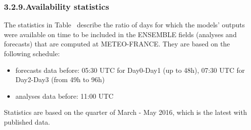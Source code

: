 \documentclass[9pt]{report}
\begin{document}
\subsubsection{3.2.9.\hspace*{0.5em}Availability statistics}\label{sec-availability-statistics}%

\noindent{}The statistics in Table~ describe the ratio of days for which the models' outputs were available on time to be included in the ENSEMBLE fields (analyses and forecasts) that are computed at METEO-FRANCE.
They are based on the following schedule:%

\begin{itemize}[noitemsep,topsep=\mdcompacttopsep]%

\item{}forecasts data before: 05:30 UTC for Day0-Day1 (up to 48h), 07:30 UTC for Day2-Day3 (from 49h to 96h)%

\item{}analyses data before: 11:00 UTC%
\end{itemize}%

\noindent{}Statistics are based on the quarter of March - May 2016, which is the latest with published data.%
\end{document}
